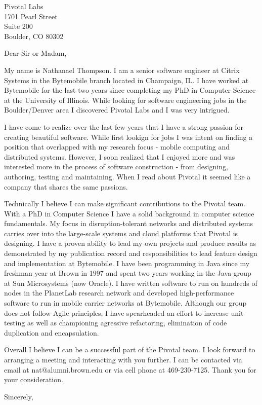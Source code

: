 \documentclass{letter}
\begin{document}
\address{Nathanael Thompson\\
1102 Lincolnshire Drive\\
Champaign, IL 61821\\
nat@alumni.brown.edu\\
(469) 230-7125 (Mobile)}
\signature{Nathanael Thompson}
\begin{letter}{Pivotal Labs\\1701 Pearl Street\\Suite 200\\Boulder, CO 80302}

\opening{Dear Sir or Madam,}
My name is Nathanael Thompson.  I am a senior software engineer at Citrix
Systems in the Bytemobile branch located in Champaign, IL.  I have worked at
Bytemobile for the last two years since completing my PhD in Computer Science at
the University of Illinois.  While looking for software engineering jobs in the
Boulder/Denver area I discovered Pivotal Labs and I was very intrigued.

I have come to realize over the last few years that I have a strong passion for
creating beautiful software. While first lookign for jobs I was intent on
finding a position that overlapped with my research focus - mobile computing and
distributed systems.  However, I soon realized that I enjoyed more and was
interested more in the process of software construction - from designing,
authoring, testing and maintaining.  When I read about Pivotal it seemed like
a company that shares the same passions.

Technically I believe I can make significant contributions to the Pivotal team.
With a PhD in Computer Science I have a solid background in computer science
fundamentals.  My focus in disruption-tolerant networks and distributed systems
carries over into the large-scale systems and cloud platforms that Pivotal is
designing.  I have a proven ability to lead my own projects and produce results
as demonstrated by my publication record and responsibilities to lead
feature design and implementation at Bytemobile.  I have been programming in
Java since my freshman year at Brown in 1997 and spent two years working in the
Java group at Sun Microsystems (now Oracle).  I have written software to run on
hundreds of nodes in the PlanetLab research network and developed
high-performance software to run in mobile carrier networks at Bytemobile.
Although our group does not follow Agile principles, I have 
spearheaded an effort to increase unit testing as well as championing agressive
refactoring, elimination of code duplication and encapsulation.


Overall I believe I can be a successful part of the Pivotal team.
I look forward to arranging a meeting and
interacting with you further.  
I can be contacted via email at
nat@alumni.brown.edu or via cell phone at 469-230-7125.  
Thank you for your consideration.

\closing{Sincerely,}
\end{letter}
\end{document}
